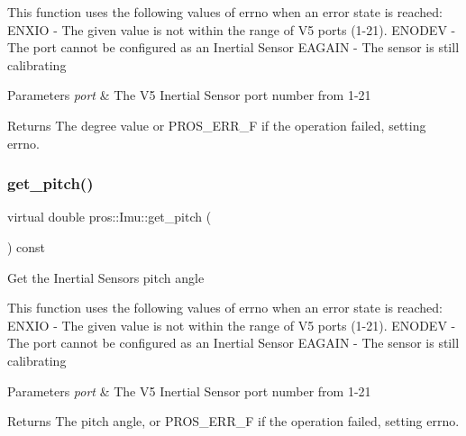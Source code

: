This function uses the following values of errno when an error state is reached\+: E\+N\+X\+IO -\/ The given value is not within the range of V5 ports (1-\/21). E\+N\+O\+D\+EV -\/ The port cannot be configured as an Inertial Sensor E\+A\+G\+A\+IN -\/ The sensor is still calibrating


\begin{DoxyParams}{Parameters}
{\em port} & The V5 Inertial Sensor port number from 1-\/21 \\
\hline
\end{DoxyParams}
\begin{DoxyReturn}{Returns}
The degree value or P\+R\+O\+S\+\_\+\+E\+R\+R\+\_\+F if the operation failed, setting errno. 
\end{DoxyReturn}
\mbox{\label{classpros_1_1Imu_a9d9e7ad1da6ea8877c48e1b4fadfe8ee}} 
\subsubsection{\texorpdfstring{get\+\_\+pitch()}{get\_pitch()}}
{\footnotesize\ttfamily virtual double pros\+::\+Imu\+::get\+\_\+pitch (\begin{DoxyParamCaption}{ }\end{DoxyParamCaption}) const\hspace{0.3cm}{\ttfamily [virtual]}}

Get the Inertial Sensor\textquotesingle{}s pitch angle

This function uses the following values of errno when an error state is reached\+: E\+N\+X\+IO -\/ The given value is not within the range of V5 ports (1-\/21). E\+N\+O\+D\+EV -\/ The port cannot be configured as an Inertial Sensor E\+A\+G\+A\+IN -\/ The sensor is still calibrating


\begin{DoxyParams}{Parameters}
{\em port} & The V5 Inertial Sensor port number from 1-\/21 \\
\hline
\end{DoxyParams}
\begin{DoxyReturn}{Returns}
The pitch angle, or P\+R\+O\+S\+\_\+\+E\+R\+R\+\_\+F if the operation failed, setting errno. 
\end{DoxyReturn}
\mbox{\label{classpros_1_1Imu_a3656b2476bb3ab8c2539615f76a0db39}} 
